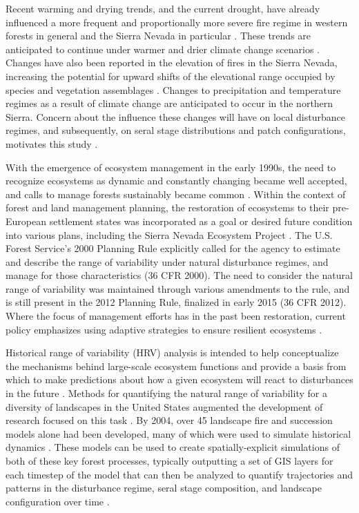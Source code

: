 Recent warming and drying trends, and the current drought, have already influenced a more frequent and proportionally more severe fire regime in western forests in general and the Sierra Nevada in particular \citep{McKenzie2004,Westerling2011,Miller2012}. These trends are anticipated to continue under warmer and drier climate change scenarios \citep{Dale2001,Westerling2008,Cook2004}. Changes have also been reported in the elevation of fires in the Sierra Nevada, increasing the potential for upward shifts of the elevational range occupied by species and vegetation assemblages \citep{Schwartz2015}. Changes to precipitation and temperature regimes as a result of climate change are anticipated to occur in the northern Sierra. Concern about the influence these changes will have on local disturbance regimes, and subsequently, on seral stage distributions and patch configurations, motivates this study \citep{Fule2008,North2012}.

With the emergence of ecosystem management in the early 1990s, the need to recognize ecosystems as dynamic and constantly changing became well accepted, and calls to manage forests sustainably became common \citep{Christensen1996}. Within the context of forest and land management planning, the restoration of ecosystems to their pre-European settlement states was incorporated as a goal or desired future condition into various plans, including the Sierra Nevada Ecosystem Project \citep{SNEP1996a}. The U.S. Forest Service's 2000 Planning Rule explicitly called for the agency to estimate and describe the range of variability under natural disturbance regimes, and manage for those characteristics (36 CFR  2000). The need to consider the natural range of variability was maintained through various amendments to the rule, and is still present in the 2012 Planning Rule, finalized in early 2015 (36 CFR  2012). Where the focus of management efforts has in the past been restoration, current policy emphasizes using adaptive strategies to ensure resilient ecosystems \citep{Stephens2010}.

Historical range of variability (HRV) analysis is intended to help conceptualize the mechanisms behind large-scale ecosystem functions and provide a basis from which to make predictions about how a given ecosystem will react to disturbances in the future \citep{Nonaka2005,Landres1999}. Methods for quantifying the natural range of variability for a diversity of landscapes in the United States augmented the development of research focused on this task \citep{Landres1999}. By 2004, over 45 landscape fire and succession models alone had been developed, many of which were used to simulate historical dynamics \citep{Keane2004}. These models can be used to create spatially-explicit simulations of both of these key forest processes, typically outputting a set of GIS layers for each timestep of the model that can then be analyzed to quantify trajectories and patterns in the disturbance regime, seral stage composition, and landscape configuration over time \citep{Keane2004}. 

